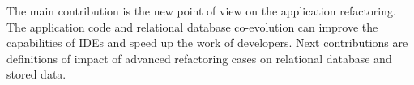 \documentclass[runningheads]{comsis}
\begin{document}
The main contribution is the new point of view on the application refactoring. The application code and relational database co-evolution can improve the capabilities of IDEs and speed up the work of developers. Next contributions are definitions of impact of advanced refactoring cases on relational database and stored data.

     
   






\end{document}
